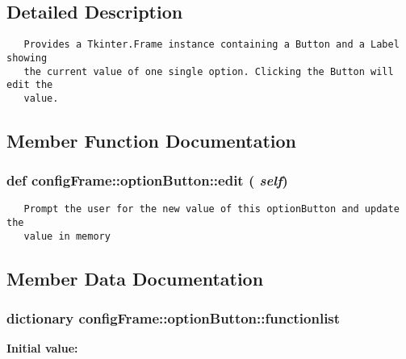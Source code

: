 \subsection{Detailed Description}


\footnotesize\begin{verbatim}
   Provides a Tkinter.Frame instance containing a Button and a Label showing
   the current value of one single option. Clicking the Button will edit the
   value.
\end{verbatim}
\normalsize
 



\subsection{Member Function Documentation}
\subsubsection{\setlength{\rightskip}{0pt plus 5cm}def config\-Frame::option\-Button::edit ( {\em self})}\label{classconfigFrame_1_1optionButton_a8ec46762f996a8a060b7a4564eb321e}




\footnotesize\begin{verbatim}
   Prompt the user for the new value of this optionButton and update the
   value in memory
\end{verbatim}
\normalsize
 

\subsection{Member Data Documentation}
\subsubsection{\setlength{\rightskip}{0pt plus 5cm}dictionary config\-Frame::option\-Button::functionlist\hspace{0.3cm}{\tt  [static]}}\label{classconfigFrame_1_1optionButton_9a32f6638b586da5e9d14770b16b1f00}


\textbf{Initial value:}


